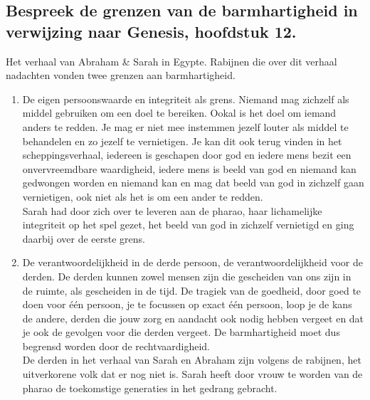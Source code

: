 \documentclass[11pt,a4paper,titlepage]{article}
\begin{document}
\subsection{Bespreek de grenzen van de barmhartigheid in verwijzing naar Genesis, hoofdstuk 12.}
Het verhaal van Abraham \& Sarah in Egypte. Rabijnen die over dit verhaal nadachten vonden twee grenzen aan barmhartigheid.
\begin{enumerate}
\item De eigen persoonswaarde en integriteit als grens. Niemand mag zichzelf als middel gebruiken om een doel te bereiken. Ookal is het doel om iemand anders te redden. Je mag er niet mee instemmen jezelf louter als middel te behandelen en zo jezelf te vernietigen. Je kan dit ook terug vinden in het scheppingsverhaal, iedereen is geschapen door god en iedere mens  bezit een onvervreemdbare waardigheid, iedere mens is beeld van god en niemand kan gedwongen worden en niemand kan en mag dat beeld van god in zichzelf gaan vernietigen, ook niet als het is om een ander te redden.\\ Sarah had door zich over te leveren aan de pharao, haar lichamelijke integriteit op het spel gezet, het beeld van god in zichzelf vernietigd en ging daarbij over de eerste grens.
\item De verantwoordelijkheid in de derde persoon, de verantwoordelijkheid voor de derden. De derden kunnen zowel mensen zijn die gescheiden van ons zijn in de ruimte, als gescheiden in de tijd. De tragiek van de goedheid, door goed te doen voor één persoon, je te focussen op exact één persoon, loop je de kans de andere, derden die jouw zorg en aandacht ook nodig hebben vergeet en dat je ook de gevolgen voor die derden vergeet. De barmhartigheid moet dus begrensd worden door de rechtvaardigheid.\\ De derden in het verhaal van Sarah en Abraham zijn volgens de rabijnen, het uitverkorene volk dat er nog niet is. Sarah heeft door vrouw te worden van de pharao de toekomstige generaties in het gedrang gebracht.
\end{enumerate}
\end{document}
